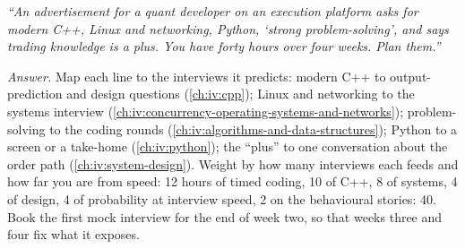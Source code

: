 \begin{omfigure}

\label{fig:iv:what-each-interview-tests-by-role:loops}
\end{omfigure}

\begin{example}\label{ex:iv:what-each-interview-tests-by-role:advert}
\emph{``An advertisement for a quant developer on an execution platform asks for modern C++, Linux and networking,
Python, `strong problem-solving', and says trading knowledge is a plus. You have forty hours over four weeks. Plan
them.''}

\emph{Answer.} Map each line to the interviews it predicts: modern C++ to output-prediction and design questions
(\cref{ch:iv:cpp}); Linux and networking to the systems interview
(\cref{ch:iv:concurrency-operating-systems-and-networks}); problem-solving to the coding rounds
(\cref{ch:iv:algorithms-and-data-structures}); Python to a screen or a take-home (\cref{ch:iv:python}); the
``plus'' to one conversation about the order path (\cref{ch:iv:system-design}). Weight by how many interviews each
feeds and how far you are from speed: 12 hours of timed coding, 10 of C++, 8 of systems, 4 of design, 4 of probability
at interview speed, 2 on the behavioural stories: 40. Book the first mock interview for the end of week two, so that
weeks three and four fix what it exposes.
\end{example}

